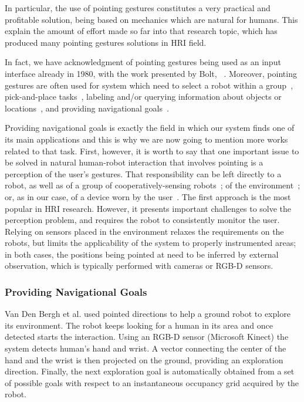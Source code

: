 In particular, the use of pointing gestures constitutes a very practical and profitable solution, being based on mechanics which are natural for humans. This explain the amount of effort made so far into that research topic, which has produced many pointing gestures solutions in \ac{HRI} field.

In fact, we have acknowledgment of pointing gestures being used as an input interface already in 1980, with the work presented by Bolt, ~\cite{Bolt1980}. Moreover, pointing gestures are often used for system which need to select a robot within a group~\cite{Nagi2014a,Pourmehr2013}, pick-and-place tasks~\cite{Brooks2006,Droeschel2011,Grossmann2014,Cosgun2015}, labeling and/or querying information about objects or locations~\cite{Brooks2006,Pateraki2014,Akkil2016}, and providing navigational goals~\cite{VanDenBergh2011,Abidi2013,Wolf2013,Jevtic2015,Gromov2016,Tolgyessy2017}.

Providing navigational goals is exactly the field in which our system finds one of its main applications and this is why we are now going to mention more works related to that task. First, however, it is worth to say that one important issue to be solved in natural human-robot interaction that involves pointing is a perception of the user's gestures. That responsibility can be left directly to a robot, as well as of a group of cooperatively-sensing robots~\cite{Giusti2012,Pourmehr2013}; of the environment~\cite{zivkovic2008toward}; or, as in our case, of a device worn by the user~\cite{Sugiyama2013,Wolf2013,Gromov2016}. The first approach is the most popular in \ac{HRI} research. However, it presents important challenges to solve the perception problem, and requires the robot to consistently monitor the user. Relying on sensors placed in the environment relaxes the requirements on the robots, but limits the applicability of the system to properly instrumented areas; in both cases, the positions being pointed at need to be inferred by external observation, which is typically performed with cameras or \acs{RGB-D} sensors.

\subsubsection*{Providing Navigational Goals}
Van Den Bergh et al. \cite{VanDenBergh2011} used pointed directions to help a ground robot to explore its environment. The robot keeps looking for a human in its area and once detected starts the interaction. Using an \acs{RGB-D} sensor (Microsoft Kinect) the system detects human's hand and wrist. A vector connecting the center of the hand and the wrist is then projected on the ground, providing an exploration direction. Finally, the next exploration goal is automatically obtained from a set of possible goals with respect to an instantaneous occupancy grid acquired by the robot. 

